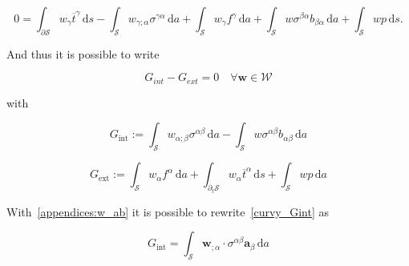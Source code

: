 \documentclass[../main.tex]{subfiles}
\begin{document}
    \begin{equation}\label{weak_form_curvy}
    0 = \int_{\partial \mathcal{S}} w_{\gamma} \overline{t}^{\gamma} \, \mathrm{d} s - \int_{\mathcal{S}} w_{\gamma ; \alpha} \sigma^{\gamma \alpha} \, \mathrm{d} a + \int_{\mathcal{S}} w_{\gamma} f^{\gamma} \, \mathrm{d} a + \int_{\mathcal{S}} w \sigma^{\beta \alpha} b_{\beta \alpha} \, \mathrm{d} a + \int_{\mathcal{S}} w p \, \mathrm{d} s.
    \end{equation}
    
    And thus it is possible to write
    
    \begin{equation}\label{eq:weak_8}
        G_{int} - G_{ext} = 0 \quad \forall \boldsymbol{w} \in \mathcal{W}
    \end{equation}
    
    with 
    
    \begin{equation}\label{curvy_Gint}
        G_{\mathrm{int}} := \int_{\mathcal{S}} w_{\alpha ; \beta} \sigma^{\alpha \beta} \, \mathrm{d} a - \int_{\mathcal{S}} w \sigma^{\alpha \beta} b_{\alpha \beta} \, \mathrm{d} a 
    \end{equation}
    
    \begin{equation}\label{curvy_Gext}
        G_{\mathrm{ext}} := \int_{\mathcal{S}} w_{\alpha} f^{\alpha} \, \mathrm{d} a + \int_{\partial_{t} \mathcal{S}} w_{\alpha} \overline{t}^{\alpha} \, \mathrm{d} s + \int_{\mathcal{S}} w p \, \mathrm{d} a
    \end{equation}
    
    
    
    With~\eqref{appendices:w_ab} it is possible to rewrite~\eqref{curvy_Gint} as
    
    \begin{equation}\label{eq:weak_11}
    G_{\mathrm{int}} = \int_{\mathcal{S}} \boldsymbol{w}_{; \alpha} \cdot \sigma^{\alpha \beta} \boldsymbol{a}_{\beta} \, \mathrm{d} a
    \end{equation}
%
%
\end{document}
